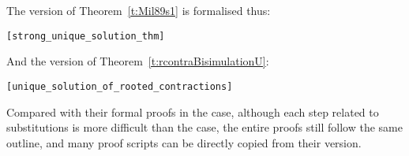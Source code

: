 The \multivariate version of Theorem~\ref{t:Mil89s1} is formalised thus:
\begin{alltt}
\HOLTokenTurnstile{}    \HOLSymConst{\HOLTokenConj{}}    \HOLSymConst{\HOLTokenConj{}}
    \HOLSymConst{\HOLTokenIn{}}     \HOLSymConst{\HOLTokenConj{}}
    \HOLSymConst{\HOLTokenIn{}}     \HOLSymConst{\HOLTokenImp{}}
    \HOLSymConst{\HOLTokenStrongEQ} \hfill{[strong_unique_solution_thm]}
\end{alltt}

And the \multivariate version of Theorem~\ref{t:rcontraBisimulationU}:
\begin{alltt}
\HOLTokenTurnstile{}    \HOLSymConst{\HOLTokenConj{}}    \HOLSymConst{\HOLTokenConj{}}
    \HOLSymConst{\HOLTokenIn{}}     \HOLSymConst{\HOLTokenConj{}}
    \HOLSymConst{\HOLTokenIn{}}     \HOLSymConst{\HOLTokenImp{}}
    \HOLSymConst{\HOLTokenObsCongr} \hfill{[unique_solution_of_rooted_contractions]}
\end{alltt}

Compared with their formal proofs in the \univariate case, although each
step related to \multivariate substitutions is more difficult than
the \univariate case, the entire proofs still follow the same outline,
and many proof scripts can be directly copied from their \univariate version.
